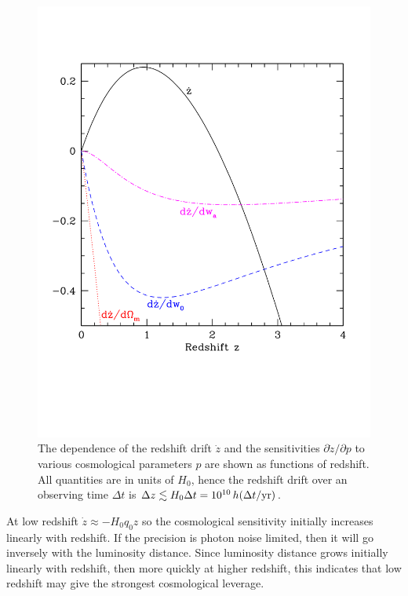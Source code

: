 \documentclass[preprint2, 10pt]{aastex}
\begin{document}
\begin{figure}
   \centering
   \includegraphics[width=\columnwidth]{zdriftd.pdf}
\caption{The dependence of the redshift drift $\dot z$ and the sensitivities 
$\partial\dot z/\partial p$ to various cosmological parameters $p$ are shown 
as functions of redshift. All quantities are in units of $H_0$, hence 
the redshift drift over an observing time $\Delta t$ is 
$\Delta z\lesssim H_0\Delta t=10^{10}\,h(\Delta t/{\rm yr})$. 
}
\label{fig:sens} 
\end{figure}


At low redshift $\dot z\approx -H_0q_0z$ so the cosmological sensitivity 
initially increases linearly with redshift. If the precision is photon 
noise limited, then it will go inversely with the luminosity distance. 
Since luminosity distance grows initially linearly with redshift, then 
more quickly at higher redshift, this indicates that low redshift may give 
the strongest cosmological leverage. 
\end{document}
